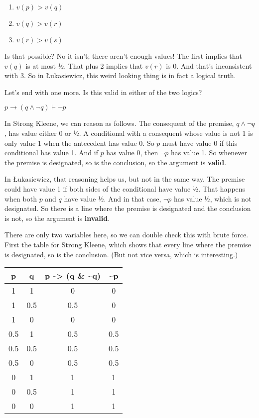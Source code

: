 \documentclass[
]{article}
\providecommand{\tightlist}{%
  \setlength{\itemsep}{0pt}\setlength{\parskip}{0pt}}\usepackage{longtable,booktabs,array}
\begin{document}
\begin{enumerate}
\def\labelenumi{\arabic{enumi}.}
\tightlist
\item
  \(v(p) > v(q)\)
\item
  \(v(q) > v(r)\)
\item
  \(v(r) > v(s)\)
\end{enumerate}

Is that possible? No it isn't; there aren't enough values! The first
implies that \(v(q)\) is at most ½. That plus 2 implies that \(v(r)\) is
0. And that's inconsistent with 3. So in Łukasiewicz, this weird looking
thing is in fact a logical truth.

Let's end with one more. Is this valid in either of the two logics?

\(p \rightarrow (q \wedge \neg q) \vdash \neg p\)

In Strong Kleene, we can reason as follows. The consequent of the
premise, \(q \wedge \neg q\), has value either 0 or ½. A conditional
with a consequent whose value is not 1 is only value 1 when the
antecedent has value 0. So \(p\) must have value 0 if this conditional
has value 1. And if \(p\) has value 0, then \(\neg p\) has value 1. So
whenever the premise is designated, so is the conclusion, so the
argument is \textbf{valid}.

In Łukasiewicz, that reasoning helps us, but not in the same way. The
premise could have value 1 if both sides of the conditional have value
½. That happens when both \(p\) and \(q\) have value ½. And in that
case, \(\neg p\) has value ½, which is not designated. So there is a
line where the premise is designated and the conclusion is not, so the
argument is \textbf{invalid}.

\newpage

There are only two variables here, so we can double check this with
brute force. First the table for Strong Kleene, which shows that every
line where the premise is designated, so is the conclusion. (But not
vice versa, which is interesting.)

\begin{longtable}[]{@{}cccc@{}}
\toprule()
p & q & p -\textgreater{} (q \& \textasciitilde q) &
\textasciitilde p \\
\midrule()
\endhead
1 & 1 & 0 & 0 \\
1 & 0.5 & 0.5 & 0 \\
1 & 0 & 0 & 0 \\
0.5 & 1 & 0.5 & 0.5 \\
0.5 & 0.5 & 0.5 & 0.5 \\
0.5 & 0 & 0.5 & 0.5 \\
0 & 1 & 1 & 1 \\
0 & 0.5 & 1 & 1 \\
0 & 0 & 1 & 1 \\
\bottomrule()
\end{longtable}
\end{document}
